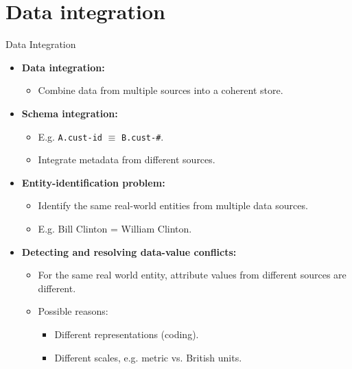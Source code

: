 \section{Data integration}

\begin{frame}{Data Integration}
	\begin{itemize}
		\item \textbf{Data integration:}
		      \begin{itemize}
			      \item Combine data from multiple sources into a coherent store.
		      \end{itemize}
		\item \textbf{Schema integration:}
		      \begin{itemize}
			      \item E.g. \texttt{A.cust-id} $\equiv$ \texttt{B.cust-\#}.
			      \item Integrate metadata from different sources.
		      \end{itemize}
		\item \textbf{Entity-identification problem:}
		      \begin{itemize}
			      \item Identify the same real-world entities from multiple data
			            sources.
			      \item E.g. Bill Clinton = William Clinton.
		      \end{itemize}
		\item \textbf{Detecting and resolving {\color{airforceblue}data-value
					      conflicts}:}
		      \begin{itemize}
			      \item For the same real world entity, attribute values from
			            different sources are different.
			      \item Possible reasons:
			            \begin{itemize}
				            \item Different representations (coding).
				            \item Different scales, e.g. metric vs. British units.
			            \end{itemize}
		      \end{itemize}
	\end{itemize}
\end{frame}

